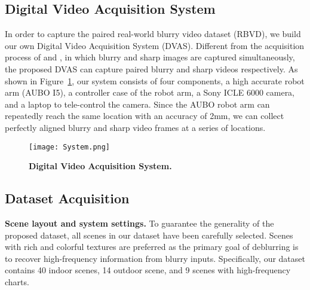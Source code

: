 \documentclass[letterpaper]{article} \usepackage{aaai22}  \usepackage{times}  \usepackage{helvet}  \usepackage{courier}  \usepackage[hyphens]{url}  \usepackage{graphicx} \urlstyle{rm} \def\UrlFont{\rm}  \usepackage{natbib}  \usepackage{caption} \DeclareCaptionStyle{ruled}{labelfont=normalfont,labelsep=colon,strut=off} \frenchspacing  \setlength{\pdfpagewidth}{8.5in}  \setlength{\pdfpageheight}{11in}  \newcommand{\hang}{\textcolor[rgb]{0.98,0.5,0.04}}
\begin{document}
\subsection{Digital Video Acquisition System}
In order to capture the paired real-world blurry video dataset ({RBVD}), we build our own Digital Video Acquisition System (DVAS).
Different from the acquisition process of \cite{ESTRNN} and \cite{RealBlur}, in which blurry and sharp images are captured simultaneously, the proposed DVAS can capture paired blurry and sharp videos respectively.
As shown in Figure~\ref{fig:VideoSystem}, our system consists of four components, 
a high accurate robot arm (AUBO I5), 
a controller case of the robot arm, a Sony ICLE 6000 camera, 
and a laptop to tele-control the camera. 
Since the AUBO robot arm can repeatedly reach the same location with an accuracy of 2mm, we can collect perfectly aligned blurry and sharp video frames at a series of locations. 
\begin{figure}[!t] 
  \centering
  \texttt{[image: System.png]}
  \vspace{-2mm}
  \caption{\textbf{Digital Video Acquisition System.}
}
\label{fig:VideoSystem}
\vspace{-4mm}
\end{figure}


\subsection{Dataset Acquisition}
{\bf Scene layout and system settings.} 
To guarantee the generality of the proposed dataset, all scenes in our dataset have been carefully selected.
Scenes with rich and colorful textures are preferred as the primary goal of deblurring is to recover high-frequency information from blurry inputs.
Specifically, our dataset contains 40 indoor scenes, 14 outdoor scene, and 9 scenes with high-frequency charts. 
\end{document}
